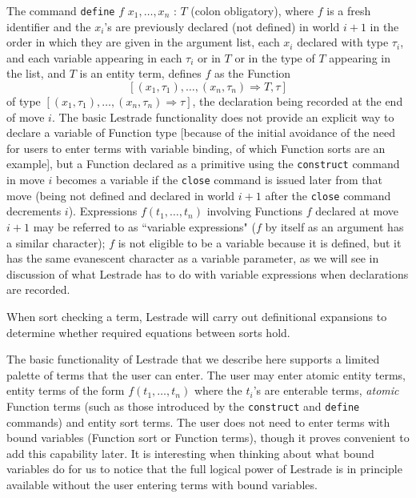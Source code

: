 \documentclass{article}
\begin{document}
The command {\tt define} $f$ $x_1, \ldots,x_n$ : $T$ (colon obligatory), where $f$ is a fresh identifier and the $x_i$'s are previously declared (not defined) in world $i+1$ in the order in which they are given in the argument list, each $x_i$ declared with type $\tau_i$, and each variable appearing in each $\tau_i$ or in $T$ or in the type of $T$ appearing in the list, and $T$ is an entity term, defines $f$ as the Function $$[(x_1,\tau_1),\ldots,(x_n,\tau_n) \Rightarrow T,\tau]$$ of type
$[(x_1,\tau_1),\ldots,(x_n,\tau_n) \Rightarrow \tau]$, the declaration being recorded at the end of move $i$.  The basic Lestrade functionality does not provide an explicit way to declare a variable of Function type [because of the initial avoidance of the need for users to enter terms with variable binding, of which Function sorts are an example], but a Function declared as a primitive using the {\tt construct} command in move $i$ becomes a variable if the {\tt close} command is issued later from that move (being not defined and declared in world $i+1$ after the {\tt close} command decrements $i$).  Expressions $f(t_1,\ldots,t_n)$ involving Functions $f$ declared at move $i+1$ may be referred to as ``variable expressions" ($f$ by itself as an argument has  a similar character);  $f$ is not eligible to be a variable because it is defined, but it has the same evanescent character as a variable parameter, as we will see in discussion of what Lestrade has to do with variable expressions when declarations are recorded.

When sort checking a term, Lestrade will carry out definitional expansions to determine whether required equations between sorts hold.

The basic functionality of Lestrade that we describe here supports a limited palette of terms that the user can enter.  The user may enter atomic entity terms,
entity terms of the form $f(t_1,\ldots,t_n)$ where the $t_i$'s are enterable terms, {\em atomic\/} Function terms (such as those introduced by the {\tt construct} and {\tt define} commands) and entity sort terms.  The user does not need to enter terms with bound variables (Function sort or Function terms), though it proves convenient to add this capability later.  It is interesting when thinking about what bound variables do for us to notice that the full logical power of Lestrade is in principle available without the user entering terms with bound variables.  
\end{document}
